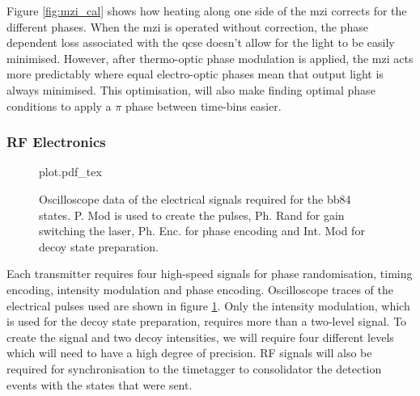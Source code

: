Figure \ref{fig:mzi_cal} shows how heating along one side of the \ac{mzi} corrects for the different phases. When the \ac{mzi} is operated without correction, the phase dependent loss associated with the \ac{qcse} doesn't allow for the light to be easily minimised. However, after thermo-optic phase modulation is applied, the \ac{mzi} acts more predictably where equal electro-optic phases mean that output light is always minimised. This optimisation, will also make finding optimal phase conditions to apply a $\pi$ phase between time-bins easier.



\subsubsection{RF Electronics}

\begin{figure}[tbp]
	\centering
	\def\svgwidth{\textwidth} 
	{plot.pdf_tex}
	\caption[Electrical signals for BB84 state generation]{Oscilloscope data of the electrical signals required for the \acs{bb84} states. P. Mod is used to create the pulses, Ph. Rand for gain switching the laser, Ph. Enc. for phase encoding and Int. Mod for decoy state preparation.}
	\label{fig:elec_signals}
\end{figure}


Each transmitter requires four high-speed signals for phase randomisation, timing encoding, intensity modulation and phase encoding. Oscilloscope traces of the electrical pulses used are shown in figure \ref{fig:elec_signals}. Only the intensity modulation, which is used for the decoy state preparation, requires more than a two-level signal. To create the signal and two decoy intensities, we will require four different levels which will need to have a high degree of precision. RF signals will also be required for synchronisation to the timetagger to consolidator the detection events with the states that were sent. 

